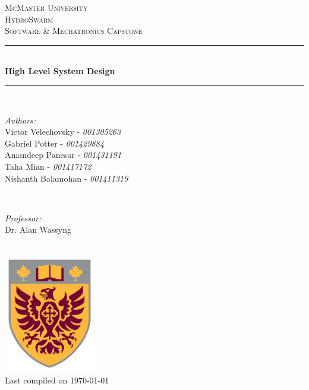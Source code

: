 \documentclass[11pt]{article}
\begin{document}
\begin{titlepage}
	\newcommand{\HRule}{\rule{\linewidth}{0.2mm}}
	\begin{center}
	\textsc{\LARGE McMaster University}\\[1.5cm]

	\textsc{\Large HydroSwarm}\\[0.5cm]
	\textsc{\large Software \& Mechatronics Capstone}\\[0.5cm]

	\HRule\\[0.4cm]
		{\huge\bfseries High Level System Design}\\[0.4cm]
	\HRule\\[0.4cm]

	\begin{minipage}[t][][t]{0.5\textwidth}
		\begin{flushleft} \large
			\emph{Authors:}\\
			Victor Velechovsky - \textit{001305263}\\
			Gabriel Potter - \textit{001429884}\\
			Amandeep Panesar - \textit{001431191} \\
			Taha Mian  - \textit{001417172}\\
			Nishanth Balamohan - \textit{001411319} \\
		\end{flushleft}
	\end{minipage}
	~
	\begin{minipage}[t][][t]{0.4\textwidth}
		\begin{flushright} \large
			\emph{Professor:} \\
			Dr. Alan Wassyng \\[0.4cm]
		\end{flushright}
	\end{minipage}\\[2cm]

	\includegraphics[width=0.3\textwidth]{logo.png} \\
	{\large Last compiled on \today}
	\end{center}

\end{titlepage}
\end{document}
